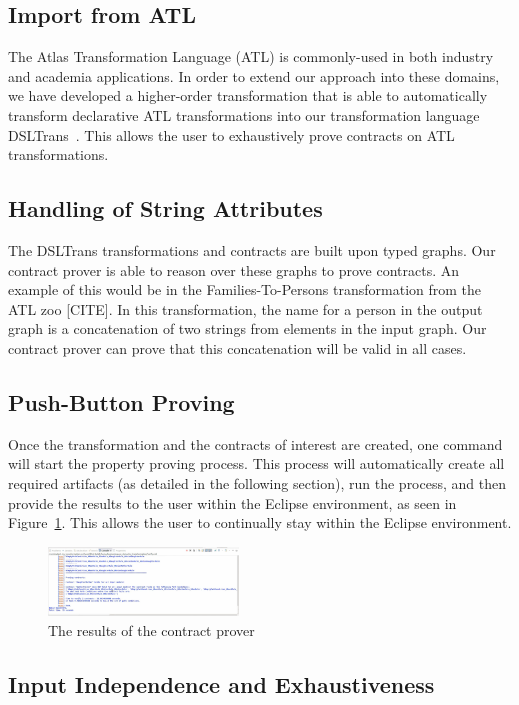 \subsection{Import from ATL}
The Atlas Transformation Language (ATL) is commonly-used in both industry and academia applications. In order to extend our approach into these domains, we have developed a higher-order transformation that is able to automatically transform declarative ATL transformations into our transformation language DSLTrans~\cite{Oakes}. This allows the user to exhaustively prove contracts on ATL transformations.

\subsection{Handling of String Attributes}
The DSLTrans transformations and contracts are built upon typed graphs. 
Our contract prover is able to reason over these graphs to prove contracts. An example of this would be in the Families-To-Persons transformation from the ATL zoo [CITE]. In this transformation, the name for a person in the output graph is a concatenation of two strings from elements in the input graph. Our contract prover can prove that this concatenation will be valid in all cases.

\subsection{Push-Button Proving}
Once the transformation and the contracts of interest are created, one command will start the property proving process. This process will automatically create all required artifacts (as detailed in the following section), run the process, and then provide the results to the user within the Eclipse environment, as seen in Figure~\ref{fig:output}. This allows the user to continually stay within the Eclipse environment.

\begin{figure}
\centering
\includegraphics[width=0.45\textwidth]{figures/output}
\caption{The results of the contract prover}
\label{fig:output}
\end{figure}

\subsection{Input Independence and Exhaustiveness}

